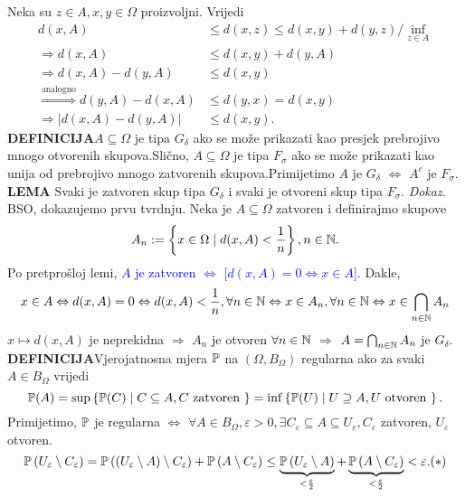 \documentclass{article}
\begin{document}
Neka su \(z\in A,x,y\in\Omega\) proizvoljni. Vrijedi \[\begin{aligned}d(x,A)&\le d(x,z)\le d(x,y)+d(y,z)/\inf_{z\in A}\\\Rightarrow d(x,A)&\le d(x,y)+d(y,A)\\\Rightarrow d(x,A)-d(y,A)&\le d(x,y)\\\overset{\text{analogno}}{\Rightarrow}d(y,A)-d(x,A)&\le d(y,x)=d(x,y)\\\Rightarrow|d(x,A)-d(y,A)|&\le d(x,y).\end{aligned}\]
\textbf{DEFINICIJA}\newline \(A\subseteq\Omega\) je tipa \(G_\delta\) ako se može prikazati kao presjek prebrojivo mnogo otvorenih skupova.\newline Slično, \(A\subseteq\Omega\) je tipa \(F_\sigma\) ako se može prikazati kao unija od prebrojivo mnogo zatvorenih skupova.\newline Primijetimo \(A\) je \(G_\delta\) \(\Leftrightarrow\) \(A^c\) je \(F_\sigma.\)\newline\newline
\textbf{LEMA}\newline
Svaki je zatvoren skup tipa \(G_\delta\) i svaki je otvoreni skup tipa \(F_\sigma.\)\newline\newline
\textit{Dokaz.}\newline
BSO, dokazujemo prvu tvrdnju. Neka je \(A\subseteq\Omega\) zatvoren i definirajmo skupove \[A_n:=\left\{x\in\Omega\mid d(x,A)<\frac1n\right\},n\in\Bbb N.\] Po pretprošloj lemi, \textcolor{Blue}{\(A\) je zatvoren \(\Leftrightarrow\) [\(d(x,A)=0\Leftrightarrow x\in A\)]}. Dakle, \[x\in A\Leftrightarrow d(x,A)=0\Leftrightarrow d(x,A)<\frac1n,\forall n\in\Bbb N\Leftrightarrow x\in A_n,\forall n\in\Bbb N\Leftrightarrow x\in\bigcap_{n\in\Bbb N}A_n\]  \(x\mapsto d(x,A)\) je neprekidna \(\Rightarrow\) \(A_n\) je otvoren \(\forall n\in\Bbb N\) \(\Rightarrow\) \(A=\bigcap_{n\in\Bbb N}A_n\) je \(G_\delta.\)\newline\newline
\textbf{DEFINICIJA}\newline Vjerojatnosna mjera \(\Bbb P\) na \((\Omega, B_\Omega)\) regularna ako za svaki \(A\in B_\Omega\) vrijedi \[\Bbb P(A)=\sup\left\{\Bbb P(C)\mid C\subseteq A,C\text{ zatvoren }\right\}=\inf\left\{\Bbb P(U)\mid U\supseteq A, U\text{ otvoren }\right\}.\] Primijetimo, \(\Bbb P\) je regularna \(\Leftrightarrow\) \(\forall A\in B_\Omega,\varepsilon>0,\exists C_\varepsilon\subseteq A\subseteq U_\varepsilon, C_\varepsilon\) zatvoren, \(U_\varepsilon\) otvoren. \[\Bbb P\left(U_\varepsilon\setminus C_\varepsilon\right)=\Bbb P\left((U_\varepsilon\setminus A)\setminus C_\varepsilon\right)+\Bbb P\left(A\setminus C_\varepsilon\right)\le\underbrace{\Bbb P\left(U_\varepsilon\setminus A\right)}_{<\frac\varepsilon2}+\underbrace{\Bbb P\left(A\setminus C_\varepsilon\right)}_{<\frac\varepsilon2}<\varepsilon.(*)\]
\end{document}
